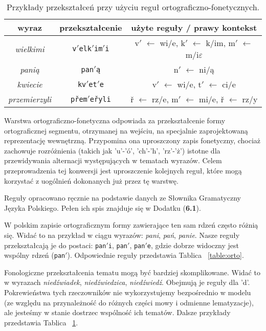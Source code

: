 \documentclass{article}
\begin{document}
\begin{table}
  \centering
  \begin{tabular}{c|c|c}
	  wyraz & przekształcenie & użyte reguły / prawy kontekst \\
	  \hline
	  \textit{wielkimi} & \texttt{v$'$elk$'$im$'$i} & v$'$ $\leftarrow$ wi/e, k$'$ $\leftarrow$ k/im, m$'$ $\leftarrow$ m/i$\varepsilon$ \\
	  \textit{panią} & \texttt{pan$'$ą} & n$'$ $\leftarrow$ ni/ą \\
	  \textit{kwiecie} & \texttt{kv$'$et$'$e} & v$'$ $\leftarrow$ wi/e, t$'$ $\leftarrow$ ci/e \\
	  \textit{przemierzyli} & \texttt{přem$'$eřyli} & ř $\leftarrow$ rz/e, m$'$ $\leftarrow$ mi/e, ř $\leftarrow$ rz/y  \\
  \end{tabular}
	\caption{Przykłady przekształceń przy użyciu reguł ortograficzno-fonetycznych.\label{table:ortoprz}}
\end{table}

Warstwa ortograficzno-fonetyczna odpowiada za przekształcenie formy ortograficznej segmentu, otrzymanej na wejściu, na specjalnie zaprojektowaną reprezentację wewnętrzną.
Przypomina ona uproszczony zapis fonetyczny, chociaż zachowuje rozróżnienia (takich jak 'u'-'ó', 'ch'-'h', 'rz'-'ż') istotne dla przewidywania alternacji występujących w tematach wyrazów.
Celem przeprowadzenia tej konwersji jest uproszczenie kolejnych reguł, które mogą korzystać z uogólnień dokonanych już przez tę warstwę.

Reguły opracowano ręcznie na podstawie danych ze Słownika Gramatyczny Języka Polskiego.
Pełen ich spis znajduje się w Dodatku (\textbf{6.1}).

W polskim zapisie ortograficznym formy zawierające ten sam rdzeń często różnią się.
Widać to na przykład w ciągu wyrazów: \textit{pani}, \textit{pań}, \textit{panie}.
Nasze reguły przekształcają je do postaci: \texttt{pan$'$i}, \texttt{pan$'$}, \texttt{pan$'$e}, gdzie dobrze widoczny jest wspólny rdzeń (\texttt{pan$'$}).
Odpowiednie reguły przedstawia Tablica ~\ref{table:orto}.

Fonologiczne przekształcenia tematu mogą być bardziej skomplikowane.
Widać to w wyrazach \textit{niedźwiadek}, \textit{niedźwiedzica}, \textit{niedźwiedź}. Obejmują je reguły dla 'd'.
Pokrewieństwa tych rzeczowników nie wykorzystujemy bezpośrednio w modelu (ze względu na przynależność do różnych części mowy i odmienne lematyzacje), ale jesteśmy w stanie dostrzec wspólność ich tematów.
Dalsze przykłady przedstawia Tablica ~\ref{table:ortoprz}.
\end{document}
